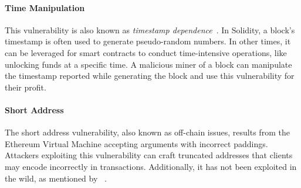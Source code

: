             \paragraph{Time Manipulation}
            This vulnerability is also known as \textit{timestamp dependence}~\cite{dasp}.
            In Solidity, a block's timestamp is often used to generate pseudo-random numbers. In other times, it can be leveraged for smart contracts to conduct time-intensive operations, like unlocking funds at a specific time.
            A malicious miner of a block can manipulate the timestamp reported while generating the block and use this vulnerability for their profit. 
        
            \paragraph{Short Address}
            The short address vulnerability, also known as off-chain issues, results from the Ethereum Virtual Machine accepting arguments with incorrect paddings.
            Attackers exploiting this vulnerability can craft truncated addresses that clients may encode incorrectly in transactions.
            Additionally, it has not been exploited in the wild, as mentioned by ~\cite{ferreira2020smartbugs}.